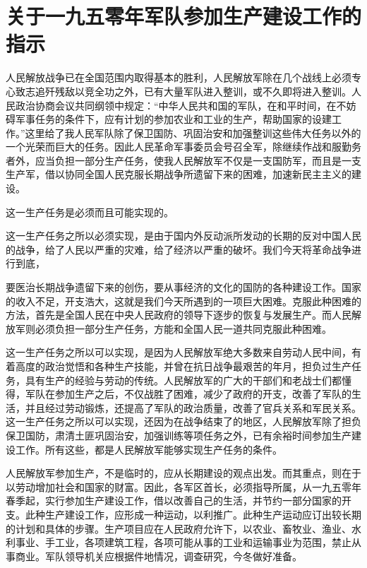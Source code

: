 \section[关于一九五零年军队参加生产建设工作的指示（一九四九年十二月五日）]{关于一九五零年军队参加生产建设工作的指示}


人民解放战争已在全国范围内取得基本的胜利，人民解放军除在几个战线上必须专心致志追歼残敌以竞全功之外，已有大量军队进入整训，或不久即将进入整训。人民政治协商会议共同纲领中规定：“中华人民共和国的军队，在和平时间，在不妨碍军事任务的条件下，应有计划的参加农业和工业的生产，帮助国家的设建工作。”这里给了我人民军队除了保卫国防、巩固治安和加强整训这些伟大任务以外的一个光荣而巨大的任务。因此人民革命军事委员会号召全军，除继续作战和服勤务者外，应当负担一部分生产任务，使我人民解放军不仅是一支国防军，而且是一支生产军，借以协同全国人民克服长期战争所遗留下来的困难，加速新民主主义的建设。

这一生产任务是必须而且可能实现的。

这一生产任务之所以必须实现，是由于国内外反动派所发动的长期的反对中国人民的战争，给了人民以严重的灾难，给了经济以严重的破坏。我们今天将革命战争进行到底，

要医治长期战争遗留下来的创伤，要从事经济的文化的国防的各种建设工作。国家的收入不足，开支浩大，这就是我们今天所遇到的一项巨大困难。克服此种困难的方法，首先是全国人民在中央人民政府的领导下逐步的恢复与发展生产。而人民解放军则必须负担一部分生产任务，方能和全国人民一道共同克服此种困难。

这一生产任务之所以可以实现，是因为人民解放军绝大多数来自劳动人民中间，有着高度的政治觉悟和各种生产技能，并曾在抗日战争最艰苦的年月，担负过生产任务，具有生产的经验与劳动的传统。人民解放军的广大的干部们和老战士们都懂得，军队在参加生产之后，不仅战胜了困难，减少了政府的开支，改善了军队的生活，并且经过劳动锻炼，还提高了军队的政治质量，改善了官兵关系和军民关系。这一生产任务之所以可以实现，还因为在战争结束了的地区，人民解放军除了担负保卫国防，肃清土匪巩固治安，加强训练等项任务之外，已有余裕时间参加生产建设工作。所有这些，都是人民解放军能够实现生产任务的条件。

人民解放军参加生产，不是临时的，应从长期建设的观点出发。而其重点，则在于以劳动增加社会和国家的财富。因此，各军区首长，必须指导所属，从一九五零年春季起，实行参加生产建设工作，借以改善自己的生活，并节约一部分国家的开支。此种生产建设工作，应形成一种运动，以利推广。此种生产运动应订出较长期的计划和具体的步骤。生产项目应在人民政府允许下，以农业、畜牧业、渔业、水利事业、手工业，各项建筑工程，各项可能从事的工业和运输事业为范围，禁止从事商业。军队领导机关应根据件地情况，调查研究，今冬做好准备。

